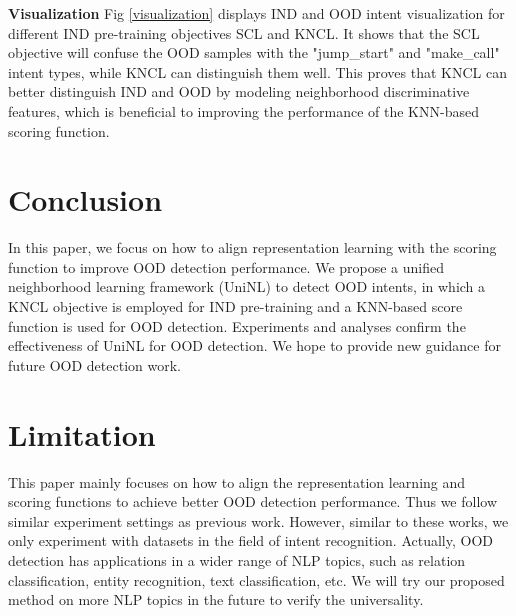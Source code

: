 \documentclass[11pt]{article}
\begin{document}




\textbf{Visualization} Fig \ref{visualization} displays IND and OOD intent visualization for different IND pre-training objectives SCL and KNCL. It shows that the SCL objective will confuse the OOD samples with the "jump\_start" and "make\_call" intent types, while KNCL can distinguish them well. This proves that KNCL can better distinguish IND and OOD by modeling neighborhood discriminative features, which is beneficial to improving the performance of the KNN-based scoring function.

\section{Conclusion}
In this paper, we focus on how to align representation learning with the scoring function to improve OOD detection performance. We propose a unified neighborhood learning framework (UniNL) to detect OOD intents, in which a KNCL objective is employed for IND pre-training and a KNN-based score function is used for OOD detection. Experiments and analyses confirm the effectiveness of UniNL for OOD detection. We hope to provide new guidance for future OOD detection work.


\section*{Limitation}
This paper mainly focuses on how to align the representation learning and scoring functions to achieve better OOD detection performance. Thus we follow similar experiment settings as previous work. 
However, similar to these works, we only experiment with datasets in the field of intent recognition. Actually, OOD detection has applications in a wider range of NLP topics, such as relation classification, entity recognition, text classification, etc. We will try our proposed method on more NLP topics in the future to verify the universality.
\end{document}
